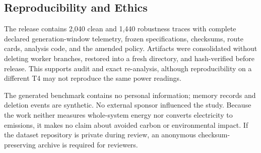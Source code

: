 \subsection{Reproducibility and Ethics}

The release contains 2,040 clean and 1,440 robustness traces with complete declared
generation-window telemetry, frozen specifications, checksums, route cards,
analysis code, and the amended policy. Artifacts were consolidated without deleting
worker branches, restored into a fresh directory, and hash-verified before release.
This supports audit and exact re-analysis, although reproducibility on a different
T4 may not reproduce the same power readings.

The generated benchmark contains no personal information; memory records and
deletion events are synthetic. No external sponsor influenced the study. Because
the work neither measures whole-system energy nor converts electricity to emissions,
it makes no claim about avoided carbon or environmental impact. If the dataset
repository is private during review, an anonymous checksum-preserving archive is
required for reviewers.
